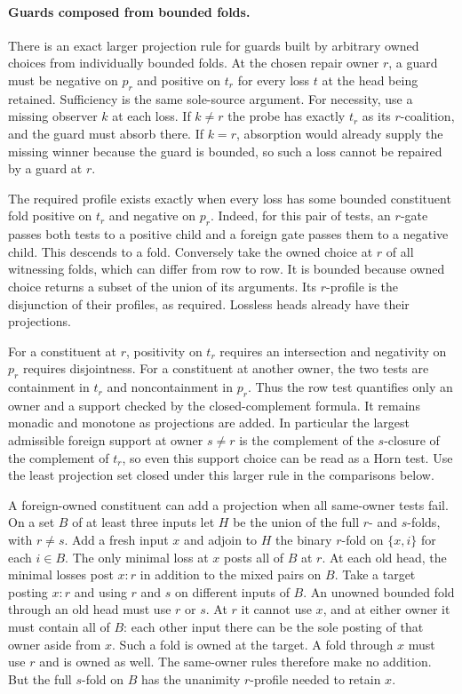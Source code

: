 \paragraph{Guards composed from bounded folds.}
There is an exact larger projection rule for guards built
by arbitrary owned choices from individually bounded folds.
At the chosen repair owner $r$, a guard must be negative
on $p_r$ and positive on $t_r$ for every loss $t$ at the
head being retained. Sufficiency is the same sole-source
argument. For necessity, use a missing observer $k$ at
each loss. If $k\ne r$ the probe has exactly $t_r$ as its
$r$-coalition, and the guard must absorb there. If $k=r$,
absorption would already supply the missing winner because
the guard is bounded, so such a loss cannot be repaired
by a guard at $r$.

The required profile exists exactly when every loss has
some bounded constituent fold positive on $t_r$ and
negative on $p_r$. Indeed, for this pair of tests, an
$r$-gate passes both tests to a positive child and a
foreign gate passes them to a negative child. This
descends to a fold. Conversely take the owned choice at
$r$ of all witnessing folds, which can differ from row
to row. It is bounded because owned choice returns a
subset of the union of its arguments. Its $r$-profile
is the disjunction of their profiles, as required.
Lossless heads already have their projections.

For a constituent at $r$, positivity on $t_r$ requires
an intersection and negativity on $p_r$ requires disjointness.
For a constituent at another owner, the two tests
are containment in $t_r$ and noncontainment in $p_r$.
Thus the row test quantifies only an owner and a support
checked by the closed-complement formula. It remains
monadic and monotone as projections are added. In particular
the largest admissible foreign support at owner $s\ne r$
is the complement of the $s$-closure of the complement
of $t_r$, so even this support choice can be read as a
Horn test. Use the least projection set closed under this
larger rule in the comparisons below.

A foreign-owned constituent can add a projection when
all same-owner tests fail.
On a set $B$ of at least three inputs let $H$ be the union
of the full $r$- and $s$-folds, with $r\ne s$. Add a fresh
input $x$ and adjoin to $H$ the binary $r$-fold on
$\{x,i\}$ for each $i\in B$. The only minimal loss at
$x$ posts all of $B$ at $r$. At each old head, the
minimal losses post $x:r$ in addition to the mixed pairs
on $B$. Take a target posting $x:r$ and using $r$ and
$s$ on different inputs of $B$. An unowned bounded fold
through an old head must use $r$ or $s$. At $r$ it cannot
use $x$, and at either owner it must contain all of $B$:
each other input there can be the sole posting of that
owner aside from $x$. Such a fold is owned at the target.
A fold through $x$ must use $r$ and is owned as well.
The same-owner rules therefore make no addition. But
the full $s$-fold on $B$ has the unanimity $r$-profile
needed to retain $x$.

